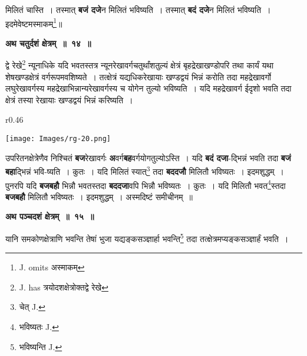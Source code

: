 \documentclass[11pt, openany]{book}
\begin{document}
\newpage 
\noindent मिलितं चास्ति~। तस्मात् \textbf{बजं दजे}न मिलितं भविष्यति~। तस्मात् \textbf{बदं दजे}न मिलितं भविष्यति~। इदमेवेष्टमस्माकम्\renewcommand{\thefootnote}{१}\footnote{{\en J. omits} अस्माकम्}\;॥ 
\vspace{2mm}

\begin{center}
\textbf{अथ चतुर्दशं क्षेत्रम्~॥~१४~॥}
\end{center}

{\ab द्वे रेखे\renewcommand{\thefootnote}{२}\footnote{{\en J. has} त्रयोदशक्षेत्रोक्तद्वे रेखे} न्यूनाधिके यदि भवतस्तत्र न्यूनरेखावर्गचतुर्थांशतुल्यं क्षेत्रं बृहद्रेखाखण्डोपरि तथा कार्यं यथा शेषखण्डक्षेत्रं वर्गरूपमवशिष्यते~। तत्क्षेत्रं यद्यधिकरेखायाः खण्डद्वयं भिन्नं करोति तदा महद्रेखावर्गो लघुरेखावर्गस्य महद्रेखाभिन्नान्यरेखावर्गस्य च योगेन तुल्यो भविष्यति~। यदि महद्रेखावर्ग ईदृशो भवति तदा क्षेत्रं तस्या रेखायाः खण्डद्वयं भिन्नं करिष्यति~। }\\

\begin{wrapfigure}{r}{0.46\textwidth}
\vspace{-8mm}
\begin{center}
\texttt{[image: Images/rg-20.png]}
\end{center}
\vspace{-8mm}
\end{wrapfigure}

 उपरितनक्षेत्रेणैव निश्चितं \textbf{बज}रेखावर्गः \textbf{अ}वर्ग\textbf{बह}वर्गयोगतुल्योऽस्ति~। यदि \textbf{बदं दजा}-द्भिन्नं भवति तदा \textbf{बजं बहा}द्भिन्नं भवि-ष्यति~। कुतः~। यदि मिलितं स्यात्\renewcommand{\thefootnote}{३}\footnote{चेत् {\en J.}} तदा \textbf{बददजौ} मिलितौ भविष्यतः~। इदमशुद्धम्~। \\

 पुनरपि यदि \textbf{बजबहौ} भिन्नौ भवतस्तदा \textbf{बददजा}वपि भिन्नौ भविष्यतः~। कुतः~। यदि मिलितौ भवत\renewcommand{\thefootnote}{४}\footnote{भविष्यतः {\en J.}}स्तदा \textbf{बजबहौ} मिलितौ भविष्यतः~। इदमशुद्धम्~। अस्मदिष्टं समीचीनम्~॥ 
 \vspace{2mm}
 
\begin{center}
\textbf{\large अथ पञ्चदशं क्षेत्रम्~॥~१५~॥}
   \end{center}
   
 {\ab यानि समकोणक्षेत्राणि भवन्ति तेषां भुजा यद्यङ्कसञ्ज्ञार्हा भवन्ति\renewcommand{\thefootnote}{५}\footnote{भविष्यन्ति {\en J.}} तदा तत्क्षेत्रमप्यङ्कसञ्ज्ञार्हं भवति~। }

\newpage
\end{document}
